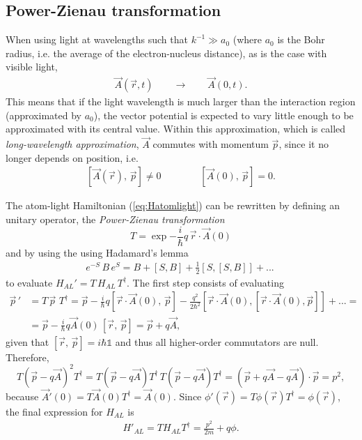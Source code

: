 \subsection{Power-Zienau transformation}

When using light at wavelengths such that $k^{-1}\gg a_0$ (where $a_0$ is the Bohr radius, i.e. the average of the electron-nucleus distance), as is the case with visible light, 
\begin{align*}
    \Vec{A}(\Vec{r}, t) \qquad \longrightarrow \qquad \Vec{A}({0}, t).
\end{align*}
This means that if the light wavelength is much larger than the interaction region (approximated by $a_0$), the vector potential is expected to vary little enough to be approximated with its central value. Within this approximation, which is called \textit{long-wavelength approximation}, $\Vec{A}$ commutes with momentum $\vec{p}$, since it no longer depends on position, i.e.
\begin{align*}
    \left[\vec{A}(\vec{r}),\, \vec{p} \right] \neq 0 \qquad \qquad  \left[\vec{A}(0),\, \vec{p} \right] = 0.
\end{align*}

The atom-light Hamiltonian (\ref{eq:Hatomlight}) can be rewritten by defining an unitary operator, the \textit{Power-Zienau transformation}
\begin{equation*}
    T = \exp{-\frac{i}{\hbar} q \, \Vec{r}\cdot\Vec{A}(0)}
\end{equation*}
and by using the using Hadamard's lemma
\begin{align*}
    e^{-S} \, B \,e^S = B+[S,B]+\frac{1}{2} [S,[S,B]]+...~
\end{align*}
to evaluate $H_{AL}'= T \, H_{AL} \, T^\dagger$. The first step consists of evaluating
\begin{align*}
    \Vec{p}\,'&=T\,\Vec{p}\,\,T^\dagger=\Vec{p}-\frac{i}{\hbar} q \left[\Vec{r}\cdot\Vec{A}(0), \, \Vec{p}\right] - \frac{q^2}{2\hbar^2} \left[\Vec{r}\cdot\Vec{A}(0),\left[\Vec{r}\cdot\Vec{A}(0),\Vec{p}\right]\right]+... = \\
    &=\Vec{p}-\frac{i}{\hbar} q \Vec{A}(0) \, \left[\Vec{r},\,\Vec{p}\right]=\Vec{p}+q\Vec{A},
\end{align*}
given that $[\Vec{r}, \, \Vec{p}]=i\hbar \mathbb{1}$ and thus all higher-order commutators are null. Therefore, 
\begin{equation*}
    T (\Vec{p}-q\Vec{A})^2 T^\dagger = T (\Vec{p}-q\Vec{A}) T^\dagger \, T (\Vec{p}-q\Vec{A}) T^\dagger = (\vec{p} + q \vec{A} - q \vec{A}) \cdot \vec{p} = p^2,
\end{equation*}
because $\vec{A}'(0) = T \vec{A}(0) T^\dagger = \vec{A}(0)$. Since $\phi'(\vec{r}) = T \phi(\vec{r}) T^\dagger = \phi(\vec{r})$, the final expression for $H_{AL}$ is
\begin{align}
    H'_{AL} = T H_{AL} T^\dagger = \frac{p^2}{2m} + q \phi. 
\end{align}

